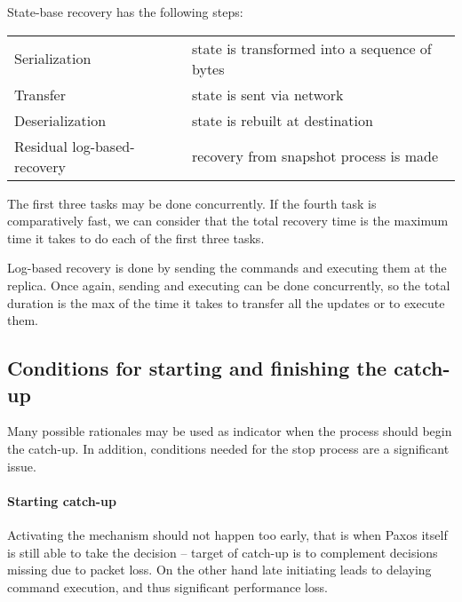 
State-base recovery has the following steps:

\begin{center}
  \begin{tabular}{ll}
    Serialization               & state is transformed into a sequence of bytes \\
    Transfer                    & state is sent via network \\
    Deserialization             & state is rebuilt at destination \vspace{0.5em} \\
    Residual log-based-recovery & recovery from snapshot process is made \\
  \end{tabular}
\end{center}

The first three tasks may be done concurrently. If the fourth task is comparatively fast, we can consider that the total recovery time is the maximum time it takes to do each of the first three tasks.


Log-based recovery is done by sending the commands and executing them at the replica. Once again, sending and executing can be done concurrently, so the total duration is the max of the time it takes to transfer all the updates or to execute them.

\subsection{Conditions for starting and finishing the catch-up}
\label{subsec:conditions_for_starting_and_finishing_the_catch_up}
Many possible rationales may be used as indicator when the process should begin the catch-up. In addition, conditions needed for the stop process are a significant issue.

\paragraph*{Starting catch-up}
Activating the mechanism should not happen too early, that is when Paxos itself is still able to take the decision -- target of catch-up is to complement decisions missing due to packet loss. On the other hand late initiating leads to delaying command execution, and thus significant performance loss.

